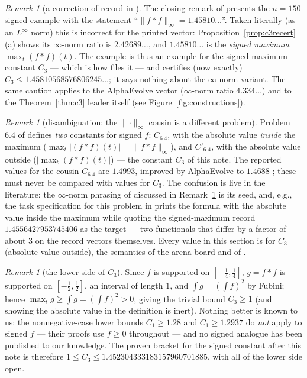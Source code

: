 \documentclass[11pt]{article}
\theoremstyle{remark}
\newtheorem{remark}[theorem]{Remark}
\newcommand{\supnorm}[1]{\lVert #1 \rVert_\infty}
\begin{document}
\begin{remark}[a correction of record in {\cite{MV10}}]\label{rem:mvnorm}
The closing remark of \cite{MV10} presents the $n = 150$ signed example
with the statement ``$\| f \ast f \|_{\infty} = 1.45810\ldots$''. Taken
literally (as an $L^\infty$ norm) this is incorrect for the printed vector:
Proposition~\ref{prop:c3recert}(a) shows its $\infty$-norm ratio is
$2.42689\ldots$, and $1.45810\ldots$ is the \emph{signed maximum}
$\max_t (f*f)(t)$. The example is thus an example for the signed-maximum
constant $C_3$ --- which is how \cite[Problem 6.4(b)]{MathScale25} files it
--- and certifies (now exactly) $C_3 \le 1.45810568576806245\ldots$; it says
nothing about the $\infty$-norm variant. The same caution applies to the
AlphaEvolve vector ($\infty$-norm ratio $4.334\ldots$) and to the
Theorem~\ref{thm:c3} leader itself (see Figure~\ref{fig:constructions}).
\end{remark}

\begin{remark}[disambiguation: the $\supnorm{\cdot}$ cousin is a different
problem]\label{rem:cousin}
Problem 6.4 of \cite{MathScale25} defines \emph{two} constants for signed
$f$: $C_{6.4}$, with the absolute value \emph{inside} the maximum
($\max_t |(f*f)(t)| = \supnorm{f*f}$), and $C'_{6.4}$, with the absolute
value outside ($|\max_t (f*f)(t)|$) --- the constant $C_3$ of this note.
The reported values for the cousin $C_{6.4}$ are $1.4993$, improved by
AlphaEvolve to $1.4688$ \cite{MathScale25}; these must never be compared
with values for $C_3$. The confusion is live in the literature: the
$\infty$-norm phrasing of \cite{MV10} discussed in Remark~\ref{rem:mvnorm}
is its seed, and, e.g., the task specification for this problem in
\cite{SimpleTES26} prints the formula with the absolute value inside the
maximum while quoting the signed-maximum record $1.4556427953745406$ as the
target --- two functionals that differ by a factor of about $3$ on the
record vectors themselves. Every value in this section is for $C_3$
(absolute value outside), the semantics of the arena board and of
\cite[6.4(b)]{MathScale25}.
\end{remark}

\begin{remark}[the lower side of $C_3$]\label{rem:c3lower}
Since $f$ is supported on $[-\tfrac14,\tfrac14]$, $g = f*f$ is supported on
$[-\tfrac12,\tfrac12]$, an interval of length $1$, and
$\int g = (\int f)^2$ by Fubini; hence
$\max_t g \ge \int g = (\int f)^2 > 0$, giving the trivial bound
$C_3 \ge 1$ (and showing the absolute value in the definition is inert).
Nothing better is known to us: the nonnegative-case lower bounds
$C_1 \ge 1.28$ \cite{CS17} and $C_1 \ge 1.2937$ \cite{KP26} do \emph{not}
apply to signed $f$ --- their proofs use $f \ge 0$ throughout --- and no
signed analogue has been published to our knowledge. The proven bracket for
the signed constant after this note is therefore
$1 \le C_3 \le 1.452304333183157960701885$, with all of the lower side
open.
\end{remark}
\end{document}
